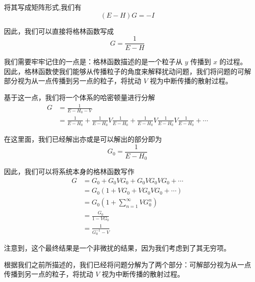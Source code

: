 \documentclass{article}
\begin{document}
将其写成矩阵形式,我们有 
\begin{equation*}
    \left(E - H\right)G = -I
\end{equation*}

因此，我们可以直接将格林函数写成
\begin{equation*}
    G = \frac{1}{E - H}
\end{equation*}

我们需要牢牢记住的一点是：格林函数描述的是一个粒子从 $y$ 传播到 $x$ 的过程。因此，格林函数使我们能够从传播粒子的角度来解释扰动问题，我们将问题的可解部分视为从一点传播到另一点的粒子，将扰动 $V$ 视为中断传播的散射过程。

基于这一点，我们将一个体系的哈密顿量进行分解
\begin{align*}
    G &= \frac{1}{E - H_0 - V} \\
    &= \frac{1}{E - H_0} + \frac{1}{E - H_0}V\frac{1}{E - H_0} + \frac{1}{E - H_0}V\frac{1}{E - H_0}V\frac{1}{E - H_0} + \cdots
\end{align*}

在这里面，我们已经解出亦或是可以解出的部分即为
\begin{equation*}
    G_0 = \frac{1}{E - H_0}
\end{equation*}

因此，我们可以将系统本身的格林函数写作
\begin{align*}
    G &= G_0 + G_0VG_0 + G_0VG_0VG_0 + \cdots\\
    &= G_0\left(1 + V G_0 + V G_0 V G_0 + \cdots\right) \\
    &= G_0\left(1 + \sum_{n = 1}^{\infty} V G_0^n\right) \\
    &= \frac{G_0}{1 - V G_0} \\
    &= \frac{1}{G_0^{-1} - V}
\end{align*}

注意到，这个最终结果是一个非微扰的结果，因为我们考虑到了其无穷项。

根据我们之前所描述的，我们已经将问题分解为了两个部分：可解部分视为从一点传播到另一点的粒子，将扰动 $V$ 视为中断传播的散射过程。
\end{document}
